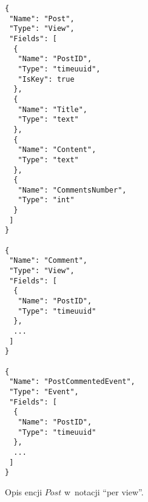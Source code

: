 \begin{figure}[!ht]
\begin{verbatim}
{
 "Name": "Post",
 "Type": "View",
 "Fields": [
  {
   "Name": "PostID",
   "Type": "timeuuid",
   "IsKey": true
  },
  {
   "Name": "Title",
   "Type": "text"
  },
  {
   "Name": "Content",
   "Type": "text"
  },
  {
   "Name": "CommentsNumber",
   "Type": "int"
  }
 ]
}

{
 "Name": "Comment",
 "Type": "View",
 "Fields": [
  {
   "Name": "PostID",
   "Type": "timeuuid"
  },
  ...
 ]
}

{
 "Name": "PostCommentedEvent",
 "Type": "Event",
 "Fields": [
  {
   "Name": "PostID",
   "Type": "timeuuid"
  },
  ...
 ]
}
\end{verbatim}
\caption{Opis encji $Post$ w~notacji ``per view''.}
\label{fig:single:model_perView}
\end{figure}
